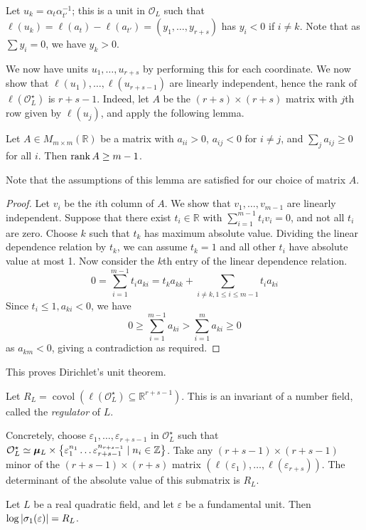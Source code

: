 Let \( u_k = \alpha_t \alpha_{t'}^{-1} \); this is a unit in \( \mathcal O_L \) such that \( \ell(u_k) = \ell(a_t) - \ell(a_{t'}) = (y_1, \dots, y_{r+s}) \) has \( y_i < 0 \) if \( i \neq k \).
Note that as \( \sum y_i = 0 \), we have \( y_k > 0 \).

We now have units \( u_1, \dots, u_{r+s} \) by performing this for each coordinate.
We now show that \( \ell(u_1), \dots, \ell(u_{r+s-1}) \) are linearly independent, hence the rank of \( \ell(\mathcal O_L^\star) \) is \( r + s - 1 \).
Indeed, let \( A \) be the \( (r + s) \times (r + s) \) matrix with \( j \)th row given by \( \ell(u_j) \), and apply the following lemma.
\begin{lemma}
    Let \( A \in M_{m \times m}(\mathbb R) \) be a matrix with \( a_{ii} > 0 \), \( a_{ij} < 0 \) for \( i \neq j \), and \( \sum_j a_{ij} \geq 0 \) for all \( i \).
    Then \( \rank A \geq m - 1 \).
\end{lemma}
Note that the assumptions of this lemma are satisfied for our choice of matrix \( A \).
\begin{proof}
    Let \( v_i \) be the \( i \)th column of \( A \).
    We show that \( v_1, \dots, v_{m-1} \) are linearly independent.
    Suppose that there exist \( t_i \in \mathbb R \) with \( \sum_{i=1}^{m-1} t_i v_i = 0 \), and not all \( t_i \) are zero.
    Choose \( k \) such that \( t_k \) has maximum absolute value.
    Dividing the linear dependence relation by \( t_k \), we can assume \( t_k = 1 \) and all other \( t_i \) have absolute value at most 1.
    Now consider the \( k \)th entry of the linear dependence relation.
    \[ 0 = \sum_{i=1}^{m-1} t_i a_{ki} = t_k a_{kk} + \sum_{i \neq k, 1 \leq i \leq m-1} t_i a_{ki} \]
    Since \( t_i \leq 1, a_{ki} < 0 \), we have
    \[ 0 \geq \sum_{i=1}^{m-1} a_{ki} > \sum_{i=1}^m a_{ki} \geq 0 \]
    as \( a_{km} < 0 \), giving a contradiction as required.
\end{proof}
This proves Dirichlet's unit theorem.

\begin{definition}
    Let \( R_L = \operatorname{covol}(\ell(\mathcal O_L^\star) \subseteq \mathbb R^{r+s-1}) \).
    This is an invariant of a number field, called the \emph{regulator} of \( L \).
\end{definition}
Concretely, choose \( \varepsilon_1, \dots, \varepsilon_{r+s-1} \) in \( \mathcal O_L^\star \) such that \( \mathcal O_L^\star \simeq \bm\mu_L \times \qty{\varepsilon_1^{n_1} \dots \varepsilon_{r+s-1}^{n_{r+s-1}} \mid n_i \in \mathbb Z} \).
Take any \( (r+s-1) \times (r+s-1) \) minor of the \( (r+s-1)\times(r+s) \) matrix \( (\ell(\varepsilon_1), \dots, \ell(\varepsilon_{r+s})) \).
The determinant of the absolute value of this submatrix is \( R_L \).
\begin{example}
    Let \( L \) be a real quadratic field, and let \( \varepsilon \) be a fundamental unit.
    Then \( \log \abs{\sigma_1(\varepsilon)} = R_L \).
\end{example}

